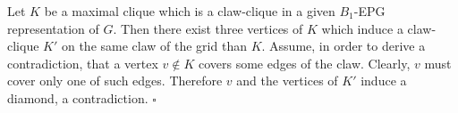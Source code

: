 \documentclass[9pt]{entcs}
\begin{document}
\begin{pf}Let $K$ be a maximal clique which is a claw-clique in a given $B_1$-EPG representation of $G$. Then there exist three vertices of $K$ which induce a claw-clique $K'$ on
the same claw of the grid than $K$. Assume, in order to derive a contradiction, that a vertex $v\notin K$ covers some edges of the claw. Clearly, $v$ must  cover
only one of such edges. Therefore $v$ and the vertices of $K'$ induce a diamond, a contradiction. $\square$

\end{pf}
\end{document}

